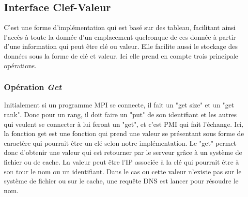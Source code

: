 \documentclass[12pt,a4paper]{article}
\begin{document}




\subsection{Interface Clef-Valeur}
C'est une forme d'implémentation qui est basé sur des tableau, facilitant ainsi l'accès à toute la donnée d'un emplacement quelconque de ces donnée à partir d'une information qui peut être clé ou valeur. Elle facilite aussi le stockage des données sous la forme de clé et valeur. Ici elle prend en compte trois principale opérations.

\subsubsection{Opération \textit{Get}}

\quad Initialement si un programme MPI se connecte, il fait un "get size" et un "get rank". Donc pour un rang, il doit faire un "put" de son identifiant et les autres qui veulent se connecter à lui feront un "get", et c'est PMI qui fait l'échange. Ici, la fonction get est une fonction qui prend une valeur se présentant sous forme de caractère qui pourrait être un clé selon notre implémentation. Le "get" permet donc d'obtenir une valeur qui est retourner par le serveur grâce à un système de fichier ou de cache. La valeur peut être l'IP associée à la clé qui pourrait être à son tour le nom ou un identifiant. Dans le cas ou cette valeur n'existe pas sur le système de fichier ou sur le cache, une requête DNS est lancer pour résoudre le nom.
\end{document}

